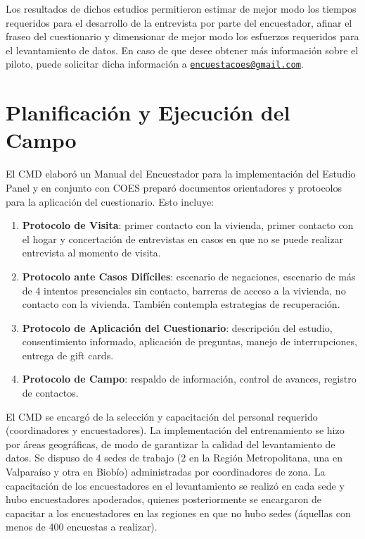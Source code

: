 \documentclass[
]{book}
\begin{document}
Los resultados de dichos estudios permitieron estimar de mejor modo los tiempos requeridos para el desarrollo de la entrevista por parte del encuestador, afinar el fraseo del cuestionario y dimensionar de mejor modo los esfuerzos requeridos para el levantamiento de datos. En caso de que desee obtener más información sobre el piloto, puede solicitar dicha información a
\href{mailto:encuestacoes@gmail.com}{\nolinkurl{encuestacoes@gmail.com}}.

\hypertarget{planificaciuxf3n-y-ejecuciuxf3n-del-campo}{%
\section{Planificación y Ejecución del Campo}\label{planificaciuxf3n-y-ejecuciuxf3n-del-campo}}

El CMD elaboró un Manual del Encuestador para la implementación del Estudio Panel y en conjunto con COES preparó documentos orientadores y protocolos para la aplicación del cuestionario. Esto incluye:

\begin{enumerate}
\def\labelenumi{\arabic{enumi}.}
\item
  \textbf{Protocolo de Visita}: primer contacto con la vivienda, primer contacto con el hogar y concertación de entrevistas en casos en que no se puede realizar entrevista al momento de visita.
\item
  \textbf{Protocolo ante Casos Difíciles}: escenario de negaciones, escenario de más de 4 intentos presenciales sin contacto, barreras de acceso a la vivienda, no contacto con la vivienda. También contempla estrategias de recuperación.
\item
  \textbf{Protocolo de Aplicación del Cuestionario}: descripción del estudio, consentimiento informado, aplicación de preguntas, manejo de interrupciones, entrega de gift cards.
\item
  \textbf{Protocolo de Campo}: respaldo de información, control de avances, registro de contactos.
\end{enumerate}

El CMD se encargó de la selección y capacitación del personal requerido (coordinadores y encuestadores). La implementación del entrenamiento se hizo por áreas geográficas, de modo de garantizar la calidad del levantamiento de datos. Se dispuso de 4 sedes de trabajo (2 en la Región Metropolitana, una en Valparaíso y otra en Biobío) administradas por coordinadores de zona. La capacitación de los encuestadores en el levantamiento se realizó en cada sede y hubo encuestadores apoderados, quienes posteriormente se encargaron de capacitar a los encuestadores en las regiones en que no hubo sedes (áquellas con menos de 400 encuestas a realizar).
\end{document}

